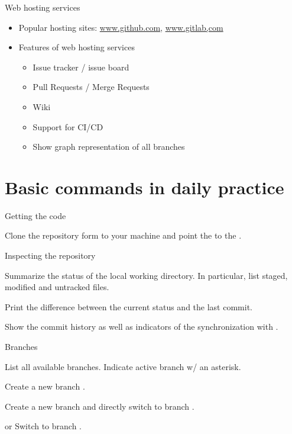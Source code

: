 \begin{frame}{Web hosting services}
\begin{itemize}
\item Popular hosting sites: \url{www.github.com}, \url{www.gitlab,com}
\item Features of web hosting services
\begin{itemize}
\item Issue tracker / issue board
\item Pull Requests / Merge Requests
\item Wiki
\item Support for CI/CD
\item Show graph representation of all branches
\end{itemize}
\end{itemize}
\end{frame}

\section{Basic commands in daily practice}

\begin{frame}{Getting the code}
\begin{block}{}
Clone the repository form  to your machine and point the  to the .
\end{block}
\end{frame}

\begin{frame}{Inspecting the repository}
\begin{block}{}
Summarize the status of the local working directory. In particular, list staged, modified and untracked files.
\end{block}
\begin{block}{}
Print the difference between the current status and the last commit.
\end{block}
\begin{block}{}
Show the commit history as well as indicators of the synchronization with .
\end{block}
\end{frame}

\begin{frame}{Branches}
\begin{block}{}
List all available branches. Indicate active branch w/ an asterisk.
\end{block}
\begin{block}{}
Create a new branch .
\end{block}
\begin{block}{}
Create a new branch  and directly switch to branch .
\end{block}
\begin{block}{ or }
Switch to branch .
\end{block}
\end{frame}

